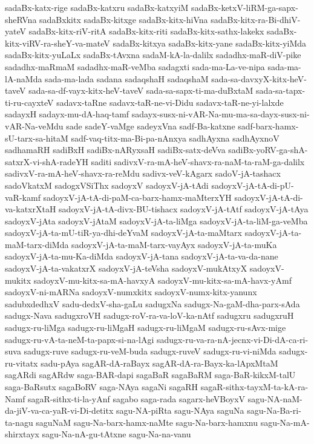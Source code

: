 {sadaBx-katx-rige
sadaBx-katxru
sadaBx-katxyiM
sadaBx-ketxV-liRM-ga-sapx-sheRVna
sadaBxkitx
sadaBx-kitxge
sadaBx-kitx-hiVna
sadaBx-kitx-ra-Bi-dhiV-yateV
sadaBx-kitx-riV-ritA
sadaBx-kitx-riti
sadaBx-kitx-sathx-lakekx
sadaBx-kitx-viRV-ra-sheY-va-mateV
sadaBx-kitxya
sadaBx-kitx-yane
sadaBx-kitx-yiMda
sadaBx-kitx-yuLaLx
sadaBx-tAvxna
sadaM-kA-la-dalilx
sadadhx-maR-diV-pike
sadadhx-maRmaM
sadadhx-maR-veMba
sadagxti
sada-ma-La-ve-nipa
sada-ma-lA-naMda
sada-ma-lada
sadana
sadaqshaH
sadaqshaM
sada-sa-davxyX-kitx-heV-taveV
sada-sa-df-vayx-kitx-heV-taveV
sada-sa-sapx-ti-ma-duBxtaM
sada-sa-tapx-ti-ru-cayxteV
sadavx-taRne
sadavx-taR-ne-vi-Didu
sadavx-taR-ne-yi-lalxde
sadayxH
sadayx-mu-dA-haq-tamf
sadayx-susx-ni-vAR-Na-mu-ma-sa-dayx-susx-ni-vAR-Na-veMdu
sade
sadeY-vaMge
sadeyxVna
sadf-Ba-katxne
sadf-barx-hamx-sU-tarx-sa-hitaM
sadf-vaq-titx-ma-Bi-pa-nAnxya
sadhAyxna
sadhAyxnoV
sadhamaRH
sadiBxH
sadiBx-nARyxsaH
sadiBx-satx-deVva
sadiBx-yoRV-ga-shA-satxrX-vi-shA-radeYH
saditi
sadivxV-ra-mA-heV-shavx-ra-naM-ta-raM-ga-dalilx
sadivxV-ra-mA-heV-shavx-ra-reMdu
sadivx-veV-kAgarx
sadoV-jA-tashacx
sadoVkatxM
sadogxVSiThx
sadoyxV
sadoyxV-jA-tAdi
sadoyxV-jA-tA-di-pU-vaR-kamf
sadoyxV-jA-tA-di-paM-ca-barx-hamx-maMterxYH
sadoyxV-jA-tA-di-va-katxrXtaH
sadoyxV-jA-tA-divx-BU-tishacx
sadoyxV-jA-tAtf
sadoyxV-jA-tAya
sadoyxV-jAta
sadoyxV-jAtaM
sadoyxV-jA-ta-liMga
sadoyxV-jA-ta-liM-ga-veMba
sadoyxV-jA-ta-mU-tiR-ya-dhi-deYvaM
sadoyxV-jA-ta-maMtarx
sadoyxV-jA-ta-maM-tarx-diMda
sadoyxV-jA-ta-maM-tarx-vayAyx
sadoyxV-jA-ta-muKa
sadoyxV-jA-ta-mu-Ka-diMda
sadoyxV-jA-tana
sadoyxV-jA-ta-va-da-nane
sadoyxV-jA-ta-vakatxrX
sadoyxV-jA-teVsha
sadoyxV-mukAtxyX
sadoyxV-mukitx
sadoyxV-mu-kitx-sa-mA-havxyA
sadoyxV-mu-kitx-sa-mA-havx-yAmf
sadoyxV-ni-mARNa
sadoyxV-numxkitx
sadoyxV-numx-kitx-yanunx
sadubxdedhxV
sadu-dedxV-sha-gaLu
sadugxNa
sadugx-Na-gaM-dha-parx-sAda
sadugx-Nava
sadugxroVH
sadugx-roV-ra-va-loV-ka-nAtf
sadugxru
sadugxruH
sadugx-ru-liMga
sadugx-ru-liMgaH
sadugx-ru-liMgaM
sadugx-ru-sAvx-mige
sadugx-ru-vA-ta-neM-ta-papx-si-na-lAgi
sadugx-ru-va-ra-nA-jecnx-vi-Di-dA-ca-ri-suva
sadugx-ruve
sadugx-ru-veM-buda
sadugx-ruveV
sadugx-ru-vi-niMda
sadugx-ru-vitatx
sadu-pAya
sagAR-dA-raBayx
sagAR-dA-ra-Bayx-ka-lApxMtaM
sagARdi
sagARdw
saga-BAR-dapi
sagaBaR
sagaBaRM
saga-BaR-kikxM-talU
saga-BaRsutx
sagaBoRV
saga-NAya
sagaNi
sagaRH
sagaR-sithx-tayxM-ta-kA-ra-Namf
sagaR-sithx-ti-la-yAnf
sagabo
saga-rada
sagarx-heVBoyxV
sagu-NA-naM-da-jiV-va-ca-yaR-vi-Di-detitx
sagu-NA-piRta
sagu-NAya
saguNa
sagu-Na-Ba-ri-ta-nagu
saguNaM
sagu-Na-barx-hamx-naMte
sagu-Na-barx-hamxnu
sagu-Na-mA-shirxtayx
sagu-Na-nA-gu-tAtxne
sagu-Na-na-vanu
}
